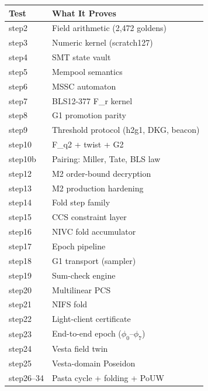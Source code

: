 \documentclass[11pt, a4paper]{article}
\theoremstyle{plain}
\theoremstyle{definition}
\theoremstyle{remark}
\begin{document}
\begin{longtable}{l l}
\textbf{Test} & \textbf{What It Proves} \\
\endhead
step2 & Field arithmetic (2,472 goldens) \\
step3 & Numeric kernel (scratch127) \\
step4 & SMT state vault \\
step5 & Mempool semantics \\
step6 & MSSC automaton \\
step7 & BLS12-377 F\_r kernel \\
step8 & G1 promotion parity \\
step9 & Threshold protocol (h2g1, DKG, beacon) \\
step10 & F\_q2 + twist + G2 \\
step10b & Pairing: Miller, Tate, BLS law \\
step12 & M2 order-bound decryption \\
step13 & M2 production hardening \\
step14 & Fold step family \\
step15 & CCS constraint layer \\
step16 & NIVC fold accumulator \\
step17 & Epoch pipeline \\
step18 & G1 transport (sampler) \\
step19 & Sum-check engine \\
step20 & Multilinear PCS \\
step21 & NIFS fold \\
step22 & Light-client certificate \\
step23 & End-to-end epoch ($\phi_0$--$\phi_7$) \\
step24 & Vesta field twin \\
step25 & Vesta-domain Poseidon \\
step26--34 & Pasta cycle + folding + PoUW \\
\bottomrule
\end{longtable}
\end{document}
